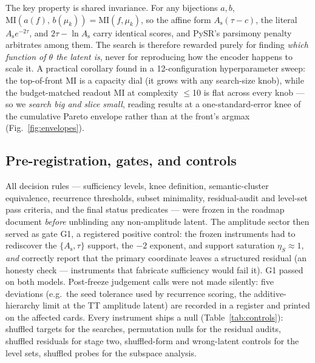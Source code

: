 \documentclass[twocolumn,10pt]{article}
\newcommand{\As}{A_\mathrm{s}}
\newcommand{\lnAs}{\ln A_\mathrm{s}}
\newcommand{\etaS}{\eta_S}
\newcommand{\MI}{\mathrm{MI}}
\newcommand{\combo}{\As e^{-2\tau}}
\begin{document}
The key property is shared invariance. For any bijections $a,b$,
$\MI\!\left(a(f),\,b(\mu_k)\right)=\MI(f,\mu_k)$, so the affine form
$\As(\tau-c)$, the literal $\combo$, and $2\tau-\lnAs$ carry identical scores,
and PySR's parsimony penalty arbitrates among them. The search is therefore
rewarded purely for finding \emph{which function of $\theta$ the latent is},
never for reproducing how the encoder happens to scale it. A practical
corollary found in a 12-configuration hyperparameter sweep: the top-of-front MI
is a capacity dial (it grows with any search-size knob), while the
budget-matched readout MI at complexity $\le$10 is flat across every knob ---
so we \emph{search big and slice small}, reading results at a one-standard-error
knee of the cumulative Pareto envelope rather than at the front's argmax
(Fig.~\ref{fig:envelopes}).

\subsection{Pre-registration, gates, and controls}
\label{sec:prereg}

All decision rules --- sufficiency levels, knee definition, semantic-cluster
equivalence, recurrence thresholds, subset minimality, residual-audit and
level-set pass criteria, and the final status predicates --- were frozen in the
roadmap document \emph{before} unblinding any non-amplitude latent. The
amplitude sector then served as gate G1, a registered positive control: the
frozen instruments had to rediscover the $\{\As,\tau\}$ support, the $-2$
exponent, and support saturation $\etaS\approx1$, \emph{and} correctly report
that the primary coordinate leaves a structured residual (an honesty check
--- instruments that fabricate sufficiency would fail it). G1 passed on both
models. Post-freeze judgement calls were not made silently: five deviations
(e.g.\ the seed tolerance used by recurrence scoring, the additive-hierarchy
limit at the TT amplitude latent) are recorded in a register and printed on the
affected cards. Every instrument ships a null (Table~\ref{tab:controls}):
shuffled targets for the searches, permutation nulls for the residual audits,
shuffled residuals for stage two, shuffled-form and wrong-latent controls for
the level sets, shuffled probes for the subspace analysis.
\end{document}
